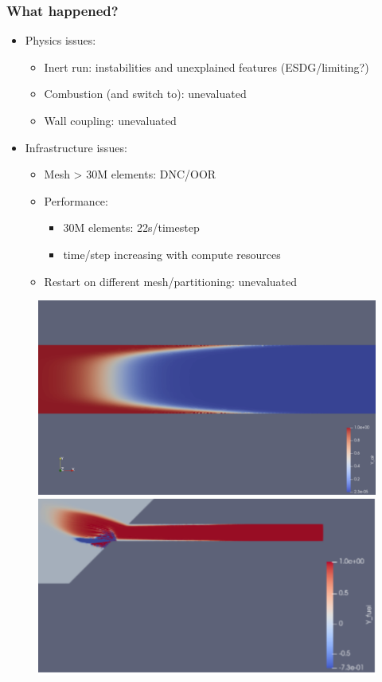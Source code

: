 \begin{frame}\frametitle{What happened?}
\begin{multicols}{2}
\begin{itemize}
\item Physics issues:
      \begin{itemize}
      \item Inert run: instabilities and unexplained features (ESDG/limiting?)
      \item Combustion (and switch to): unevaluated 
      \item Wall coupling: unevaluated
      \end{itemize}
\item Infrastructure issues:
      \begin{itemize}
      \item Mesh > 30M elements: DNC/OOR
      \item Performance:
            \begin{itemize}
            \item 30M elements: 22s/timestep
            \item time/step increasing with compute resources
            \end{itemize}
      \item Restart on different mesh/partitioning: unevaluated
      \end{itemize}
\end{itemize}
\columnbreak
\begin{figure}
\centering
\includegraphics[width=.4\textwidth]{figures/y_unstable_1.png} \\
\includegraphics[width=.4\textwidth]{figures/y_unstable_2.png}
\end{figure}		
\end{multicols}
\end{frame}


